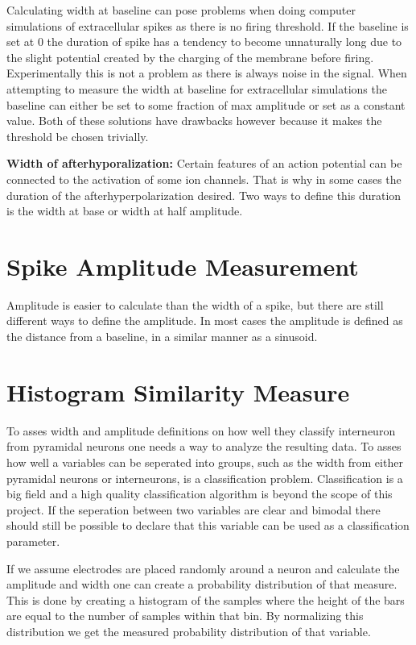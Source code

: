 \documentclass[altfont, fleqn]{uiophd}
\begin{document}
Calculating width at baseline can pose problems when doing computer simulations
of extracellular spikes as there is no firing threshold. 
If the baseline is set at 0 the duration of spike has a tendency to become 
unnaturally long due to the slight potential created by the charging
of the membrane before firing. 
Experimentally this is not a problem as there is always noise
in the signal. 
When attempting to measure 
the width at baseline for extracellular simulations
the baseline can either be set to some fraction of max amplitude
or set as a constant value. 
Both of these solutions have drawbacks however because 
it makes the threshold be chosen trivially. 
\newline

\noindent 
{\bf Width of afterhyporalization:} 
Certain features of an action potential can be connected
to the 
activation of some ion channels. 
That is why in some cases the duration of the afterhyperpolarization 
desired. 
Two ways to define this duration is the width at base or width at half 
amplitude. 
\newline

\section{Spike Amplitude Measurement}
Amplitude is easier to calculate than the width of a spike, 
but there are still different ways to define the amplitude. 
In most cases the amplitude is defined as the distance from a baseline,
in a similar manner as a sinusoid.

\section{Histogram Similarity Measure}
To asses width and amplitude definitions on how well they 
classify interneuron from pyramidal neurons
one needs a way to analyze the resulting data. 
To asses how well a variables can be seperated into groups,
such as the width from either pyramidal neurons or 
interneurons,
is a classification problem. 
Classification is a big field and 
a high quality classification algorithm is beyond the scope of this project. 
If the seperation between two variables are clear and bimodal
there should still be possible to declare that this variable can
be used as a classification parameter. 

If we assume electrodes are placed randomly around a neuron and calculate
the amplitude and width one can create a probability distribution
of that measure. 
This is done by creating a histogram of the samples 
where the height of the bars are equal to the number of samples within 
that bin. 
By normalizing this distribution we get the measured probability distribution
of that variable. 
\end{document}
